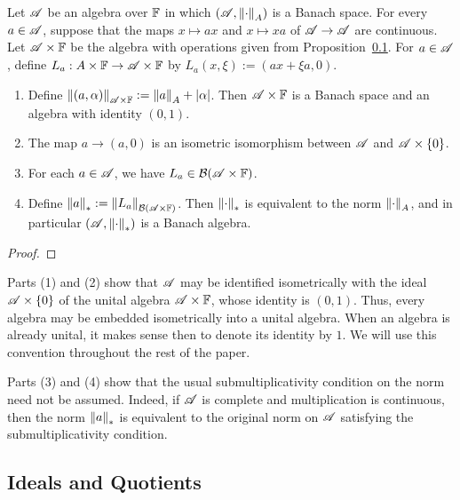 \documentclass[reqno]{amsart}
\begin{document}
\begin{proposition}
	Let $\mathscr{A}$ be an algebra over $\mathbb{F}$ in which $(\mathscr{A},\left\lVert \cdot \right\rVert_A)$ is a Banach space. For every $a \in \mathscr{A}$, suppose that the maps $x \mapsto ax$ and $x \mapsto xa$ of $\mathscr{A} \rightarrow \mathscr{A}$ are continuous. Let $\mathscr{A} \times \mathbb{F}$ be the algebra with operations given from Proposition~\ref{}. For $a \in \mathscr{A}$, define $L_a:A \times \mathbb{F} \rightarrow \mathscr{A} \times \mathbb{F}$ by $L_a(x,\xi) := (ax + \xi a,0)$.
\end{proposition}
	\mbox{}
	\begin{enumerate}[label = (\arabic*),itemsep=1pt,topsep=3pt]
		\item Define $\left\lVert (a,\alpha) \right\rVert_{\mathscr{A} \times \mathbb{F}}:= \left\lVert a \right\rVert_A + |\alpha|$. Then $\mathscr{A} \times \mathbb{F}$ is a Banach space and an algebra with identity $(0,1)$.
		\item The map $a \rightarrow (a,0)$ is an isometric isomorphism between $\mathscr{A}$ and $\mathscr{A} \times \{0\}$.
		\item For each $a \in \mathscr{A}$, we have $L_a \in \mathcal{B}(\mathscr{A} \times \mathbb{F})$.
		\item Define $\left\lVert a \right\rVert_{\ast} := \left\lVert L_a \right\rVert_{\mathcal{B}(\mathscr{A} \times \mathbb{F})}$. Then $\left\lVert \cdot \right\rVert_{\ast}$ is equivalent to the norm $\left\lVert \cdot \right\rVert_A$, and in particular $(\mathscr{A},\left\lVert \cdot \right\rVert_{\ast})$ is a Banach algebra.
	\end{enumerate}
	{\color{red}
	\begin{proof}
			
	\end{proof}}

Parts (1) and (2) show that $\mathscr{A}$ may be identified isometrically with the ideal $\mathscr{A} \times \{0\}$ of the unital algebra $\mathscr{A} \times \mathbb{F}$, whose identity is $(0,1)$. Thus, every algebra may be embedded isometrically into a unital algebra. When an algebra is already unital, it makes sense then to denote its identity by $1$. We will use this convention throughout the rest of the paper.

	Parts (3) and (4) show that the usual submultiplicativity condition on the norm need not be assumed. Indeed, if $\mathscr{A}$ is complete and multiplication is continuous, then the norm $\left\lVert a \right\rVert_{\ast}$ is equivalent to the original norm on $\mathscr{A}$ satisfying the submultiplicativity condition.


\subsection{Ideals and Quotients}
\end{document}
